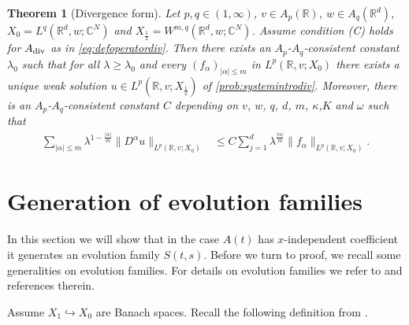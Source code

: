 \documentclass{amsart}
\theoremstyle{plain}
\newtheorem{theorem}{Theorem}[section]
\theoremstyle{remark}
\theoremstyle{plain}
\numberwithin{equation}{section}
\begin{document}
\begin{theorem}[Divergence form]\label{teo:mainxdepdiv}
Let $p,q\in (1,\infty)$, $v\in A_{p}({ \mathbb{R} })$, $w\in A_{q}({ \mathbb{R} }^{d})$, $X_0 = L^q({ \mathbb{R} }^d,w;{ \mathbb{C} }^N)$ and $X_{\frac{1}{2}} = W^{m,q}({ \mathbb{R} }^d,w;{ \mathbb{C} }^N)$. Assume condition (C) holds for $A_{\rm div}$ as in \eqref{eq:defoperatordiv}. Then there exists an $A_p$-$A_q$-consistent constant $\lambda_0$ such that for all $\lambda\geq\lambda_0$ and every $(f_\alpha)_{|\alpha|\leq m}$ in $L^{p}({ \mathbb{R} },v;X_{0})$ there exists a unique weak solution $u\in L^p({ \mathbb{R} },v;X_{\frac12})$ of \eqref{prob:systemintrodiv}. Moreover, there is an $A_p$-$A_q$-consistent constant $C$ depending on $v$, $w$, $q$, $d$, $m$, $\kappa$,$K$ and $\omega$ such that
\begin{equation}\label{eq:teomainxdepdiv}
\begin{aligned}
\sum_{|\alpha|\leq m} \lambda^{1-\frac{|\alpha|}{m}} \|D^{\alpha}u\|_{L^{p}({ \mathbb{R} },v;X_{0})} & \leq C\sum_{j=1}^d \lambda^{\frac{|\alpha|}{m}} \|f_\alpha\|_{L^{p}({ \mathbb{R} },v;X_{0})}.
\end{aligned}
\end{equation}
\end{theorem}

\section{Generation of evolution families}\label{sec:mainresult}

In this section we will show that in the case $A(t)$ has $x$-independent coefficient it generates an evolution family $S(t,s)$. Before we turn to proof, we recall some generalities on evolution families. For details on evolution families we refer to \cite{AT2, EN, Lun, Pazy, Schn, Ta1, Ta2, Ya} and references therein.

Assume $X_1\hookrightarrow X_0$ are Banach spaces. Recall the following definition from \cite{GV}.
\end{document}
